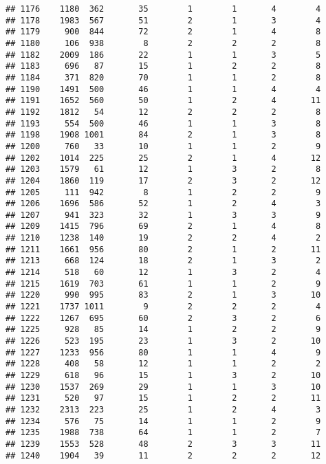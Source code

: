 \documentclass[]{article}
\begin{document}
\begin{verbatim}
## 1176    1180  362       35        1        1       4        4
## 1178    1983  567       51        2        1       3        4
## 1179     900  844       72        2        1       4        8
## 1180     106  938        8        2        2       2        8
## 1182    2009  186       22        1        1       3        5
## 1183     696   87       15        1        2       2        8
## 1184     371  820       70        1        1       2        8
## 1190    1491  500       46        1        1       4        4
## 1191    1652  560       50        1        2       4       11
## 1192    1812   54       12        2        2       2        8
## 1193     554  500       46        1        1       3        8
## 1198    1908 1001       84        2        1       3        8
## 1200     760   33       10        1        1       2        9
## 1202    1014  225       25        2        1       4       12
## 1203    1579   61       12        1        3       2        8
## 1204    1860  119       17        2        3       2       12
## 1205     111  942        8        1        2       2        9
## 1206    1696  586       52        1        2       4        3
## 1207     941  323       32        1        3       3        9
## 1209    1415  796       69        2        1       4        8
## 1210    1238  140       19        2        2       4        2
## 1211    1661  956       80        2        1       2       11
## 1213     668  124       18        2        1       3        2
## 1214     518   60       12        1        3       2        4
## 1215    1619  703       61        1        1       2        9
## 1220     990  995       83        2        1       3       10
## 1221    1737 1011        9        2        2       2        4
## 1222    1267  695       60        2        3       2        6
## 1225     928   85       14        1        2       2        9
## 1226     523  195       23        1        3       2       10
## 1227    1233  956       80        1        1       4        9
## 1228     408   58       12        1        1       2        2
## 1229     618   96       15        1        3       2       10
## 1230    1537  269       29        1        1       3       10
## 1231     520   97       15        1        2       2       11
## 1232    2313  223       25        1        2       4        3
## 1234     576   75       14        1        1       2        9
## 1235    1988  738       64        1        1       2        7
## 1239    1553  528       48        2        3       3       11
## 1240    1904   39       11        2        2       2       12

\end{verbatim}
\end{document}
